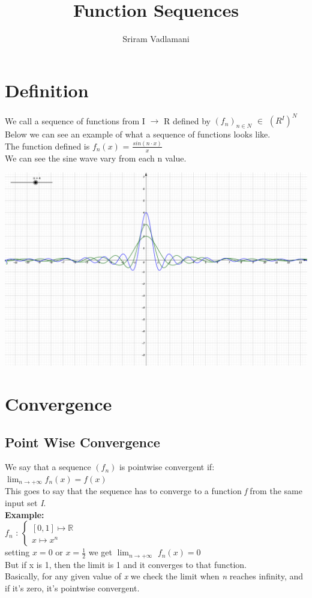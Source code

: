 \documentclass{article}
\title{Function Sequences}
\author{Sriram Vadlamani}
\begin{document}
\maketitle
\newpage
\tableofcontents
\newpage
\section{Definition}
We call a sequence of functions from I $\rightarrow$ R defined by $(f_{n})_{n \in N}$ $\in$ $(R^{I})^{N}$\\
Below we can see an example of what a sequence of functions looks like.\\
The function defined is $f_{n} (x)$ = $ \frac{sin(n \cdot x)}{x} $ \\
We can see the sine wave vary from each n value.\\
\begin{center}
	\includegraphics[scale=0.55]{functionSequence.png}
\end{center}
\section{Convergence}
\subsection{Point Wise Convergence}
We say that a sequence $(f_{n})$ is pointwise convergent if:\\
$\displaystyle\lim_{n \to +\infty} f_{n} (x) = f(x)$\\
This goes to say that the sequence has to converge to a function \textit{f} from the same input set \textit{I}.\\
\textbf{Example:}\\
$f_{n}$ : $\left\{ \begin{array}{c}[0,1] \longmapsto \mathbb{R} \\ x \longmapsto x^{n} \end{array}\right.$\\
setting $x = 0$ or $x = \frac{1}{2}$ we get $\displaystyle\lim_{n \to +\infty}$ $f_{n} (x) = 0$\\
But if x is 1, then the limit is 1 and it converges to that function.\\
Basically, for any given value of \textit{x} we check the limit when \textit{n} reaches infinity, and if it's zero, it's pointwise convergent.\\
\end{document}
